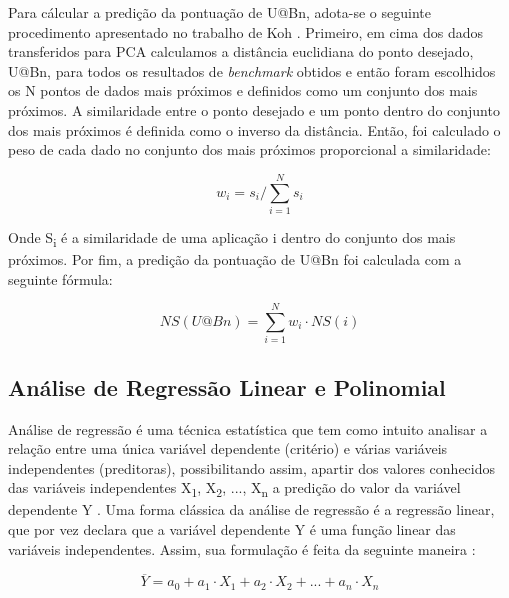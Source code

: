 Para cálcular a predição da pontuação de U@Bn, adota-se o seguinte procedimento
apresentado no trabalho de Koh \cite{koh2007}. Primeiro, em cima dos dados
transferidos para PCA calculamos a distância euclidiana do ponto desejado,
U@Bn, para todos os resultados de \textit{benchmark} obtidos e então foram
escolhidos os N pontos de dados mais próximos e definidos como um conjunto dos
mais próximos. A similaridade entre o ponto desejado e um ponto dentro do
conjunto dos mais próximos é definida como o inverso da distância. Então, foi
calculado o peso de cada dado no conjunto dos mais próximos proporcional a
similaridade:

\begin{equation}
\label{eq:prediction} 
w_i = s_i / \sum\limits_{i=1}^{N}s_i
\end{equation}

Onde S\textsubscript{i} é a similaridade de uma aplicação i dentro do conjunto
dos mais próximos. Por fim, a predição da pontuação de U@Bn foi calculada com a
seguinte fórmula:

\begin{equation}
\label{eq:simi} 
NS(U@Bn) = \sum\limits_{i=1}^{N}w_i \cdot NS(i)
\end{equation}

\subsection{Análise de Regressão Linear e Polinomial}

Análise de regressão é uma técnica estatística que tem como intuito analisar a
relação entre uma única variável dependente (critério) e várias variáveis
independentes (preditoras), possibilitando assim, apartir dos valores
conhecidos das variáveis independentes X\textsubscript{1}, X\textsubscript{2},
..., X\textsubscript{n} a predição do valor da variável dependente Y
\cite{hair}. Uma forma clássica da análise de regressão é a regressão linear,
que por vez declara que a variável dependente Y é uma função linear das
variáveis independentes. Assim, sua formulação é feita da seguinte maneira
\cite{johnson1988}:

\begin{equation}
\label{eq:linear} 
 \overline{Y} = a_0 + a_1 \cdot X_1 + a_2 \cdot X_2 + ... + a_n \cdot X_n
\end{equation}

